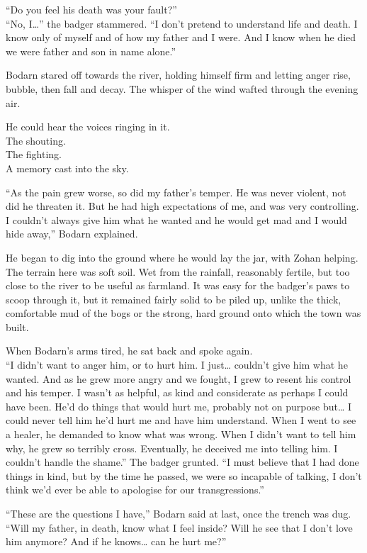 ``Do you feel his death was your fault?''\\
``No, I\ldots'' the badger stammered. ``I don't pretend to understand life and death. I know only of myself and of how my father and I were. And I know when he died we were father and son in name alone.''

Bodarn stared off towards the river, holding himself firm and letting anger rise, bubble, then fall and decay. The whisper of the wind wafted through the evening air.

He could hear the voices ringing in it.\\
The shouting.\\
The fighting.\\
A memory cast into the sky.

``As the pain grew worse, so did my father's temper. He was never violent, not did he threaten it. But he had high expectations of me, and was very controlling. I couldn't always give him what he wanted and he would get mad and I would hide away,'' Bodarn explained.

He began to dig into the ground where he would lay the jar, with Zohan helping. The terrain here was soft soil. Wet from the rainfall, reasonably fertile, but too close to the river to be useful as farmland. It was easy for the badger's paws to scoop through it, but it remained fairly solid to be piled up, unlike the thick, comfortable mud of the bogs or the strong, hard ground onto which the town was built.

When Bodarn's arms tired, he sat back and spoke again.\\
``I didn't want to anger him, or to hurt him. I just\ldots{} couldn't give him what he wanted. And as he grew more angry and we fought, I grew to resent his control and his temper. I wasn't as helpful, as kind and considerate as perhaps I could have been. He'd do things that would hurt me, probably not on purpose but\ldots{} I could never tell him he'd hurt me and have him understand. When I went to see a healer, he demanded to know what was wrong. When I didn't want to tell him why, he grew so terribly cross. Eventually, he deceived me into telling him. I couldn't handle the shame.'' The badger grunted. ``I must believe that I had done things in kind, but by the time he passed, we were so incapable of talking, I don't think we'd ever be able to apologise for our transgressions.''

``These are the questions I have,'' Bodarn said at last, once the trench was dug. ``Will my father, in death, know what I feel inside? Will he see that I don't love him anymore? And if he knows\ldots{} can he hurt me?''

